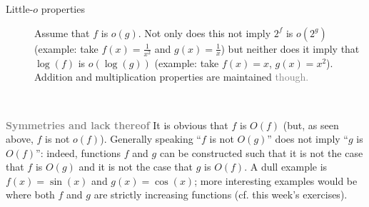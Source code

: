 \documentclass[titlepage]{article}
\theoremstyle{definition}
\numberwithin{equation}{subsection}
\numberwithin{remark}{subsection}
\begin{document}
\begin{tcolorbox}[drop shadow, title=(Properties and non-properties of big-O),lower separated=true]
\begin{description}
\item[Little-$o$ properties] Assume that $f$ is $o(g)$. Not only does this not imply $2^f$ is $o(2^g)$ (example: take $f(x)=\frac1{x^2}$ and $g(x)=\frac1x$) but neither does it imply that $\log(f)$ is $o(\log(g))$ (example: take $f(x)=x$, $g(x)=x^2$).
Addition and multiplication properties are maintained \textcolor{gray}{though.}
\end{description} 
\end{tcolorbox}
\\
\clearpage


\textbf{\textcolor{gray}{Symmetries and lack thereof}}
It is obvious that $f$ is $O(f)$ (but, as seen above, $f$ is not $o(f)$).
Generally speaking ``$f$ is not $O(g)$'' does not imply ``$g$ is $O(f)$'': indeed, functions $f$ and $g$ can be constructed such that it is not the case that $f$ is $O(g)$ and it is not the case that $g$ is $O(f)$. A dull example is $f(x)=\sin(x)$ and $g(x)=\cos(x)$; more interesting examples would be where both $f$ and $g$ are strictly increasing functions (cf. this week's exercises).
\end{document}
